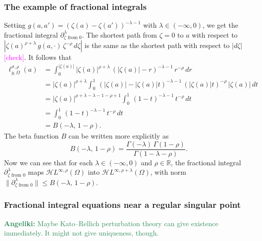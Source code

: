 \documentclass{article}
\theoremstyle{definition}
\newcommand{\R}{\mathbb{R}}
\newcommand{\holoL}[1]{\mathcal{H}L^{#1}} %
\begin{document}
\subsubsection{The example of fractional integrals}
Setting $g(a, a') = (\zeta(a) - \zeta(a'))^{-\lambda-1}$ with $\lambda \in (-\infty, 0)$, we get the fractional integral $\partial^\lambda_{\zeta \text{ from } 0}$. The shortest path from $\zeta = 0$ to $a$ with respect to $|\zeta(a)^{\rho+\lambda}\,g(a, \cdot)\,\zeta^{-\rho}\,d\zeta|$ is the same as the shortest path with respect to $|d\zeta|$ \textcolor{magenta}{[check]}. It follows that
\begin{align*}
\ell^{\sigma, \rho}_{g, \Omega}(a) & = \int_0^{|\zeta(a)|} |\zeta(a)|^{\rho+\lambda}\,(|\zeta(a)| - r)^{-\lambda-1}\,r^{-\rho}\,dr \\
& = |\zeta(a)|^{\rho+\lambda} \int_0^1 \,(|\zeta(a)| - |\zeta(a)| t)^{-\lambda-1}\,(|\zeta(a)| t)^{-\rho}\,|\zeta(a)|\,dt \\
& = |\zeta(a)|^{\rho+\lambda-\lambda-1-\rho+1} \int_0^1 \,(1-t)^{-\lambda-1}\,t^{-\rho}\,dt \\
& = \int_0^1 \,(1-t)^{-\lambda-1}\,t^{-\rho}\,dt \\
& = B(-\lambda,\,1-\rho).
\end{align*}
The beta function $B$ can be written more explicitly as
\[ B(-\lambda,\,1-\rho) = \frac{\Gamma(-\lambda)\,\Gamma(1-\rho)}{\Gamma(1-\lambda-\rho)}. \]
Now we can see that for each $\lambda \in (-\infty, 0)$ and $\rho \in \R$, the fractional integral $\partial^\lambda_{\zeta \text{ from } 0}$ maps $\holoL{\infty, \rho}(\Omega)$ into $\holoL{\infty, \rho+\lambda}(\Omega)$, with norm $\|\partial^\lambda_{\zeta \text{ from } 0}\| \le B(-\lambda,\,1-\rho)$.
\subsubsection{Fractional integral equations near a regular singular point}\label{frac_int_exist}
\textcolor{SeaGreen}{\textbf{Angeliki:} Maybe Kato--Rellich perturbation theory can give existence immediately. It might not give uniqueness, though.}
\end{document}
